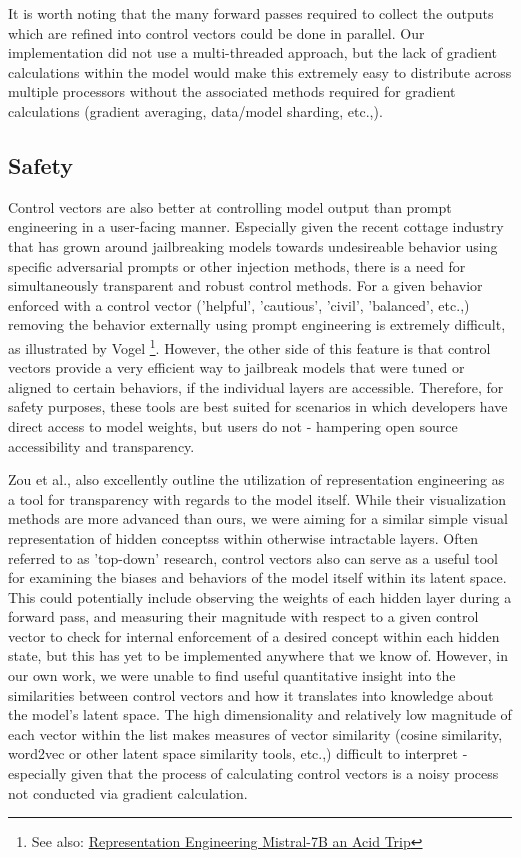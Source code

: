 \documentclass[11pt,a4paper]{article}
\begin{document}
It is worth noting that the many forward passes required to collect the outputs which are refined into control vectors could be done in parallel. Our implementation did not use a multi-threaded approach, but the lack of gradient calculations within the model would make this extremely easy to distribute across multiple processors without the associated methods required for gradient calculations (gradient averaging, data/model sharding, etc.,).

\subsection{Safety}
Control vectors are also better at controlling model output than prompt engineering in a user-facing manner. Especially given the recent cottage industry that has grown around jailbreaking models towards undesireable behavior using specific adversarial prompts or other injection methods, there is a need for simultaneously transparent and robust control methods. For a given behavior enforced with a control vector ('helpful', 'cautious', 'civil', 'balanced', etc.,) removing the behavior externally using prompt engineering is extremely difficult, as illustrated by Vogel \cite{vogel2024repeng} \footnote{See also: \href{https://vgel.me/posts/representation-engineering/}{Representation Engineering Mistral-7B an Acid Trip}}. However, the other side of this feature is that control vectors provide a very efficient way to jailbreak models that were tuned or aligned to certain behaviors, if the individual layers are accessible. Therefore, for safety purposes, these tools are best suited for scenarios in which developers have direct access to model weights, but users do not - hampering open source accessibility and transparency.

Zou et al., \cite{zou2023representation} also excellently outline the utilization of representation engineering as a tool for transparency with regards to the model itself. While their visualization methods are more advanced than ours, we were aiming for a similar simple visual representation of hidden conceptss within otherwise intractable layers. Often referred to as 'top-down' research, control vectors also can serve as a useful tool for examining the biases and behaviors of the model itself within its latent space. This could potentially include observing the weights of each hidden layer during a forward pass, and measuring their magnitude with respect to a given control vector to check for internal enforcement of a desired concept within each hidden state, but this has yet to be implemented anywhere that we know of. However, in our own work, we were unable to find useful quantitative insight into the similarities between control vectors and how it translates into knowledge about the model's latent space. The high dimensionality and relatively low magnitude of each vector within the list makes measures of vector similarity (cosine similarity, word2vec or other latent space similarity tools, etc.,) difficult to interpret - especially given that the process of calculating control vectors is a noisy process not conducted via gradient calculation.
\end{document}
